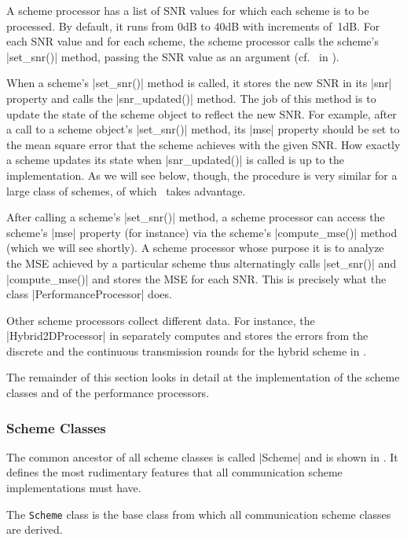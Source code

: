 A scheme processor has a list of SNR values for which each scheme is to be
processed. By default, it runs from 0dB to 40dB with increments of~1dB. For
each SNR value and for each scheme, the scheme processor calls the scheme's
|set_snr()| method, passing the SNR value as an argument (cf.~ in
). 

When a scheme's |set_snr()| method is called, it stores the new SNR in its |snr|
property and calls the |snr_updated()| method. The job of this method is to
update the state of the scheme object to reflect the new SNR. For example, after
a call to a scheme object's |set_snr()| method, its |mse| property should be set
to the mean square error that the scheme achieves with the given SNR. How
exactly a scheme updates its state when |snr_updated()| is called is up to the
implementation. As we will see below, though, the procedure is very similar for
a large class of schemes, of which \jscsim\ takes advantage. 

After calling a scheme's |set_snr()| method, a scheme processor can access
the scheme's |mse| property (for instance) via the scheme's |compute_mse()|
method (which we will see shortly). A scheme processor whose purpose it is to
analyze the MSE achieved by a particular scheme thus alternatingly calls
|set_snr()| and |compute_mse()| and stores the MSE for each SNR. This is
precisely what the class |PerformanceProcessor| does. 

Other scheme processors collect different data. For instance, the
|Hybrid2DProcessor| in  separately computes and stores
the errors from the discrete and the continuous transmission rounds for the
hybrid scheme in .

The remainder of this section looks in detail at the implementation of the
scheme classes and of the performance processors.


\subsubsection{Scheme Classes}

The common ancestor of all scheme classes is called |Scheme| and is shown in
. It defines the most rudimentary features that all
communication scheme implementations must have. 

\begin{listing}
\caption{The \texttt{Scheme} class is the base class from which all
communication scheme classes are derived.}
\label{lst:schemeclass}
\end{listing}

